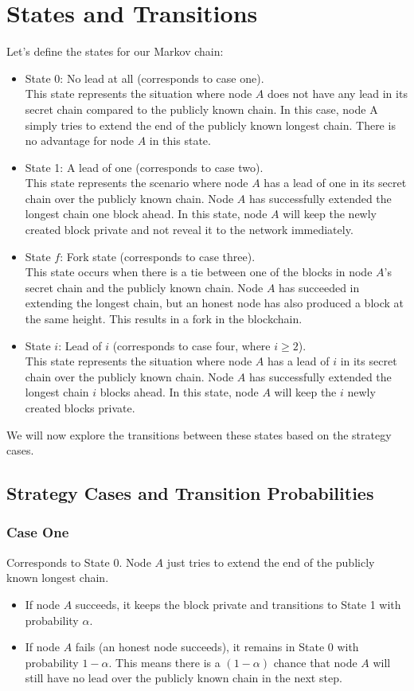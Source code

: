 \section{States and Transitions}
Let's define the states for our Markov chain:
\begin{itemize}
    \item State 0: No lead at all (corresponds to case one).\\
    This state represents the situation where node $A$ does not have any lead in its secret chain compared to the publicly known chain. In this case, node A simply tries to extend the end of the publicly known longest chain. There is no advantage for node $A$ in this state.
    \item State 1: A lead of one (corresponds to case two).\\
    This state represents the scenario where node $A$ has a lead of one in its secret chain over the publicly known chain. Node $A$ has successfully extended the longest chain one block ahead. In this state, node $A$ will keep the newly created block private and not reveal it to the network immediately.
    \item State $f$: Fork state (corresponds to case three).\\
    This state occurs when there is a tie between one of the blocks in node $A$'s secret chain and the publicly known chain. Node $A$ has succeeded in extending the longest chain, but an honest node has also produced a block at the same height. This results in a fork in the blockchain.
    \item State $i$: Lead of $i$ (corresponds to case four, where $i \geq 2$).\\
    This state represents the situation where node $A$ has a lead of $i$ in its secret chain over the publicly known chain. Node $A$ has successfully extended the longest chain $i$ blocks ahead. In this state, node $A$ will keep the $i$ newly created blocks private.
\end{itemize}

We will now explore the transitions between these states based on the strategy cases.

\subsection{Strategy Cases and Transition Probabilities}
\subsubsection{Case One}
Corresponds to State 0. Node $A$ just tries to extend the end of the publicly known longest chain.
\begin{itemize}
    \item If node $A$ succeeds, it keeps the block private and transitions to State 1 with probability $\alpha$.
    \item If node $A$ fails (an honest node succeeds), it remains in State 0 with probability $1 - \alpha$. This means there is a $(1 - \alpha)$ chance that node $A$ will still have no lead over the publicly known chain in the next step.
\end{itemize}

